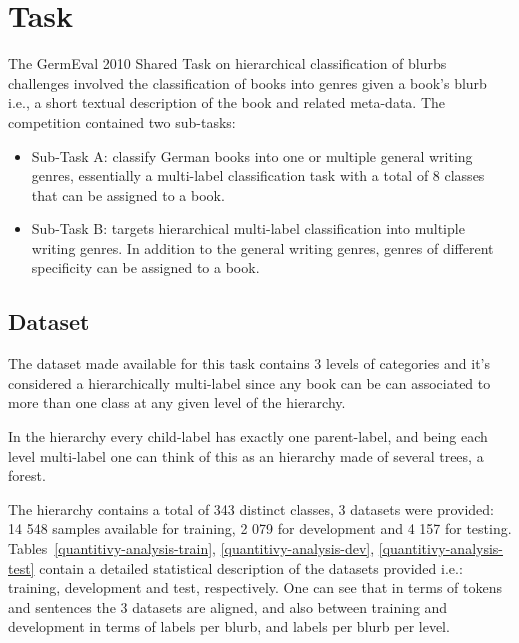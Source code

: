 \documentclass[11pt,a4paper]{article}
\begin{document}
\section{Task}\label{task}

The GermEval 2010 Shared Task on hierarchical classification of blurbs challenges
involved the classification of books into genres given a book's blurb i.e., a
short textual description of the book and related meta-data. The competition
contained two sub-tasks:

\begin{itemize}

\item Sub-Task A: classify German books into one or multiple general writing
genres, essentially a multi-label classification task with a total of 8 classes
that can be assigned to a book.

\item Sub-Task B: targets hierarchical multi-label classification into multiple
writing genres. In addition to the general writing genres, genres of different
specificity can be assigned to a book.

\end{itemize}


\subsection{Dataset}

The dataset made available for this task contains 3 levels of categories and
it's considered a hierarchically multi-label since any book can be can associated
to more than one class at any given level of the hierarchy.

In the hierarchy every child-label has exactly one parent-label, and being
each level multi-label one can think of this as an hierarchy made of several
trees, a forest.

The hierarchy contains a total of 343 distinct classes, 3 datasets were
provided: 14 548 samples available for training, 2 079 for development and
4 157 for testing. Tables~\ref{quantitivy-analysis-train}, \ref{quantitivy-analysis-dev},
\ref{quantitivy-analysis-test}  contain a detailed statistical description of
the datasets provided i.e.: training, development and test, respectively. One can
see that in terms of tokens and sentences the 3 datasets are aligned, and also
between training and development in terms of labels per blurb, and labels per blurb
per level.
\end{document}
